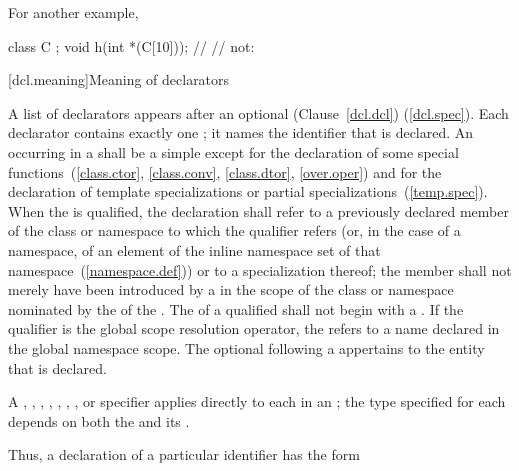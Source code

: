 For another example,

\begin{codeblock}
class C { };
void h(int *(C[10]));           // 
                                // not: 
\end{codeblock}
\exitexample

[dcl.meaning]{Meaning of declarators}%

\pnum
A list of declarators appears after an optional (Clause~\ref{dcl.dcl})
(\ref{dcl.spec}).
%
Each declarator contains exactly one
;
it names the identifier that is declared.
An
occurring in
a
shall be a simple
except for the declaration of some special functions~(\ref{class.ctor},
\ref{class.conv}, \ref{class.dtor}, \ref{over.oper}) and
for the declaration of template specializations
or partial specializations~(\ref{temp.spec}).
When the
is qualified, the declaration shall refer to a previously declared member
of the class or namespace to which the qualifier refers (or,
in the case of a namespace,
of an element of the inline namespace
set of that namespace~(\ref{namespace.def})) or to a specialization thereof; the member
shall not merely have been introduced by a
in the scope of the class or namespace nominated by the
of the
.
The  of a qualified  shall not
begin with a .
\enternote
If the qualifier is the global
\tcode{::}
scope resolution operator, the
refers to a name declared in the global namespace scope.
\exitnote
The optional  following a  appertains to the entity that is declared.

\pnum
A
,
,
,
,
,
,
,
or
specifier applies directly to each
in an
;
the type specified for each
depends on both the
and its
.

\pnum
Thus, a declaration of a particular identifier has the form

